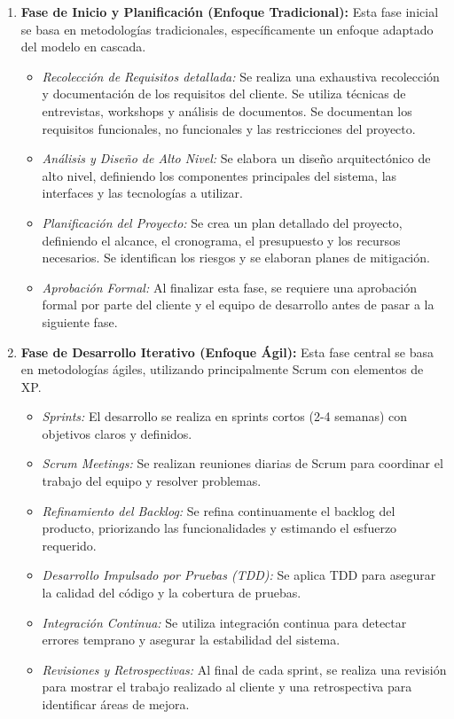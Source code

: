 \documentclass[12pt, spanish]{article}
\begin{document}
\begin{enumerate}
    \item \textbf{Fase de Inicio y Planificación (Enfoque Tradicional):} Esta fase inicial se basa en metodologías tradicionales, específicamente un enfoque adaptado del modelo en cascada.
    \begin{itemize}
        \item \textit{Recolección de Requisitos detallada:} Se realiza una exhaustiva recolección y documentación de los requisitos del cliente. Se utiliza técnicas de entrevistas, workshops y análisis de documentos. Se documentan los requisitos funcionales, no funcionales y las restricciones del proyecto.
        \item \textit{Análisis y Diseño de Alto Nivel:} Se elabora un diseño arquitectónico de alto nivel, definiendo los componentes principales del sistema, las interfaces y las tecnologías a utilizar.
        \item \textit{Planificación del Proyecto:} Se crea un plan detallado del proyecto, definiendo el alcance, el cronograma, el presupuesto y los recursos necesarios. Se identifican los riesgos y se elaboran planes de mitigación.
        \item \textit{Aprobación Formal:} Al finalizar esta fase, se requiere una aprobación formal por parte del cliente y el equipo de desarrollo antes de pasar a la siguiente fase.
    \end{itemize}

    \item \textbf{Fase de Desarrollo Iterativo (Enfoque Ágil):}  Esta fase central se basa en metodologías ágiles, utilizando principalmente Scrum con elementos de XP.
    \begin{itemize}
        \item \textit{Sprints:} El desarrollo se realiza en sprints cortos (2-4 semanas) con objetivos claros y definidos.
        \item \textit{Scrum Meetings:} Se realizan reuniones diarias de Scrum para coordinar el trabajo del equipo y resolver problemas.
        \item \textit{Refinamiento del Backlog:} Se refina continuamente el backlog del producto, priorizando las funcionalidades y estimando el esfuerzo requerido.
        \item \textit{Desarrollo Impulsado por Pruebas (TDD):} Se aplica TDD para asegurar la calidad del código y la cobertura de pruebas.
        \item \textit{Integración Continua:} Se utiliza integración continua para detectar errores temprano y asegurar la estabilidad del sistema.
        \item \textit{Revisiones y Retrospectivas:} Al final de cada sprint, se realiza una revisión para mostrar el trabajo realizado al cliente y una retrospectiva para identificar áreas de mejora.
    \end{itemize}


\end{enumerate}
\end{document}
